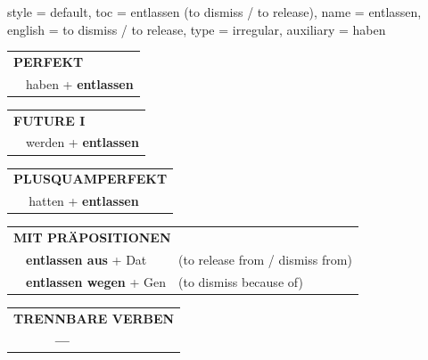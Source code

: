 \begin{verbentry}{
  style = {default},
  toc = {entlassen (to dismiss / to release)},
  name = {entlassen},
  english = {to dismiss / to release},
  type = {irregular},
  auxiliary = {haben}
}
 \begin{tabular}{rl}
     \multicolumn{2}{l}{\textbf{PERFEKT}}\\
   & haben + \textbf{entlassen}\\
  \end{tabular}
\hfill
   \begin{tabular}{rl}
    \multicolumn{2}{l}{\textbf{FUTURE I} }\\
   & werden + \textbf{entlassen}\\
  \end{tabular}
\hfill
   \begin{tabular}{rl}
      \multicolumn{2}{l}{\textbf{PLUSQUAMPERFEKT}}\\
   & hatten + \textbf{entlassen}\\
  \end{tabular}

   \vspace{10pt}

   \begin{tabular}{lll}
      \multicolumn{3}{l}{\textbf{MIT PRÄPOSITIONEN}}\\
& \textbf{entlassen aus} + Dat & (to release from / dismiss from)\\
& \textbf{entlassen wegen} + Gen & (to dismiss because of)\\
\end{tabular}
  \hfill
   \begin{tabular}{lll}
\multicolumn{3}{l}{\textbf{TRENNBARE VERBEN}}\\
& \textbf{---} & \\
\end{tabular}

  \vspace{-5pt}
\end{verbentry}

